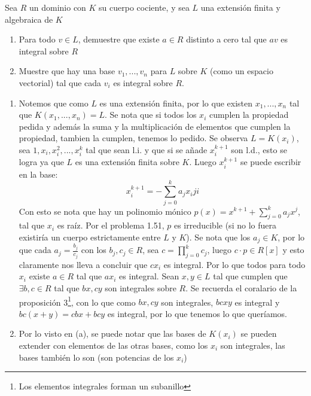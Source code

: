 \begin{prob}{1.54}
    Sea \(R\) un dominio con \(K\) su cuerpo cociente, y sea \(L\) una extensión finita y algebraica de \(K\)
    \begin{enumerate}
        \item Para todo \(v\in L\), demuestre que existe \(a\in R\) distinto a cero tal que \(av\) es integral sobre \(R\)
        \item Muestre que hay una base \(v_1,...,v_n\) para \(L\) sobre \(K\) (como un espacio vectorial) tal que cada \(v_i\) es integral sobre \(R\).
    \end{enumerate}
\end{prob}

\begin{sol}{1.54}
    \begin{enumerate}
        \item Notemos que como \(L\) es una extensión finita, por lo que existen \(x_1,...,x_n\) tal que \(K(x_1,...,x_n)=L\). Se nota que si todos los \(x_i\) cumplen la propiedad pedida y además la suma y la multiplicación de elementos que cumplen la propiedad, tambien la cumplen, tenemos lo pedido. Se observa \(L=K(x_i)\), sea \(1,x_i,x_i^2,...,x_i^k\) tal que sean l.i. y que si se añade \(x_i^{k+1}\) son l.d., esto se logra ya que \(L\) es una extensión finita sobre \(K\). Luego \(x_i^{k+1}\) se puede escribir en la base:
              \begin{equation}
                  x_i^{k+1}=-\sum_{j=0}^ka_jx_iji
              \end{equation}
              Con esto se nota que hay un polinomio mónico \(p(x)=x^{k+1}+\sum_{j=0}^ka_jx^j\), tal que \(x_i\) es raíz. Por el problema 1.51, \(p\) es irreducible (si no lo fuera existiría un cuerpo estrictamente entre \(L\) y \(K\)). Se nota que los \(a_j\in K\), por lo que cada \(a_j=\frac{b_j}{c_j}\) con los \(b_j,c_j\in R\), sea \(c=\prod_{j=0}^kc_j\), luego \(c\cdot p\in R[x]\) y esto claramente nos lleva a concluir que \(cx_i\) es integral. Por lo que todos para todo \(x_i\) existe \(a\in R\) tal que \(ax_i\) es integral.
              Sean \(x,y\in L\) tal que cumplen que \(\exists b,c\in R\) tal que \(bx,cy\) son integrales sobre \(R\). Se recuerda el coralario de la proposición 3\footnote{Los elementos integrales forman un subanillo}, con lo que como \(bx,cy\) son integrales, \(bcxy\) es integral y \(bc(x+y)=cbx+bcy\) es integral, por lo que tenemos lo que queríamos.
        \item Por lo visto en (a), se puede notar que las bases de \(K(x_i)\) se pueden extender con elementos de las otras bases, como los \(x_i\) son integrales, las bases también lo son (son potencias de los \(x_i\))
    \end{enumerate}
\end{sol}

